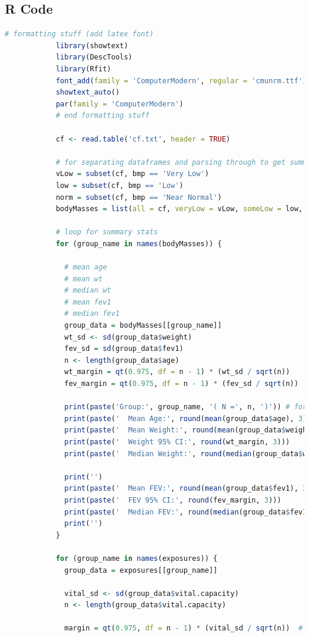 \documentclass{article}
\begin{document}
		\subsection*{R Code}

		\begin{lstlisting}[language=R, basicstyle=\tiny]
			# formatting stuff (add latex font)
			library(showtext)
			library(DescTools)
			library(Rfit)
			font_add(family = 'ComputerModern', regular = 'cmunrm.ttf') # for consistent formatting in LaTex
			showtext_auto()
			par(family = 'ComputerModern')
			# end formatting stuff
			
			cf <- read.table('cf.txt', header = TRUE)
			
			# for separating dataframes and parsing through to get summaries
			vLow = subset(cf, bmp == 'Very Low')
			low = subset(cf, bmp == 'Low')
			norm = subset(cf, bmp == 'Near Normal')
			bodyMasses = list(all = cf, veryLow = vLow, someLow = low, nearNorm = norm)
			
			# loop for summary stats
			for (group_name in names(bodyMasses)) {
			
			  # mean age
			  # mean wt
			  # median wt
			  # mean fev1
			  # median fev1
			  group_data = bodyMasses[[group_name]]
			  wt_sd <- sd(group_data$weight)
			  fev_sd = sd(group_data$fev1)
			  n <- length(group_data$age)
			  wt_margin = qt(0.975, df = n - 1) * (wt_sd / sqrt(n))
			  fev_margin = qt(0.975, df = n - 1) * (fev_sd / sqrt(n))
			
			  print(paste('Group:', group_name, '( N =', n, ')')) # for future reference: paste() used to concatenate strings
			  print(paste('  Mean Age:', round(mean(group_data$age), 3))) # prints mean age
			  print(paste('  Mean Weight:', round(mean(group_data$weight), 3)))
			  print(paste('  Weight 95% CI:', round(wt_margin, 3)))
			  print(paste('  Median Weight:', round(median(group_data$weight), 3)))
			
			  print('')
			  print(paste('  Mean FEV:', round(mean(group_data$fev1), 3)))
			  print(paste('  FEV 95% CI:', round(fev_margin, 3)))
			  print(paste('  Median FEV:', round(median(group_data$fev1), 3)))
			  print('')
			}
			
			for (group_name in names(exposures)) {
			  group_data = exposures[[group_name]]
			
			  vital_sd <- sd(group_data$vital.capacity)
			  n <- length(group_data$vital.capacity)
			
			  margin = qt(0.975, df = n - 1) * (vital_sd / sqrt(n))  # margin for 95% CI
			

\end{lstlisting}
\end{document}
